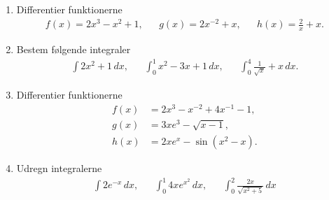 \begin{enumerate}
	\item Differentier funktionerne
	\begin{align*}
	f(x)=2x^3-x^2+1,&& g(x)=2x^{-2}+x,&& h(x)=\frac{2}{x}+x.
	\end{align*}
	
	\item Bestem følgende integraler
	\begin{align*}
	\int 2x^2+1 \, dx,&& \int_0^1 x^2-3x+1\, dx,&& \int_0^4 \frac{1}{\sqrt{x}}+x \, dx.
	\end{align*}
	
	
	\item Differentier funktionerne
	\begin{align*}
	f(x)&=2x^3-x^{-2}+4x^{-1}-1,\\ g(x)&=3xe^3-\sqrt{x-1},\\ h(x)&=2xe^x-\sin(x^2-x).
	\end{align*}
	
	\item Udregn integralerne
	\begin{align*}
	\int 2e^{-x} \, dx,&& \int_0^1 4xe^{x^2}\, dx, && \int_0^2 \frac{2x}{\sqrt{x^2+5}}\, dx
	\end{align*}
\end{enumerate}